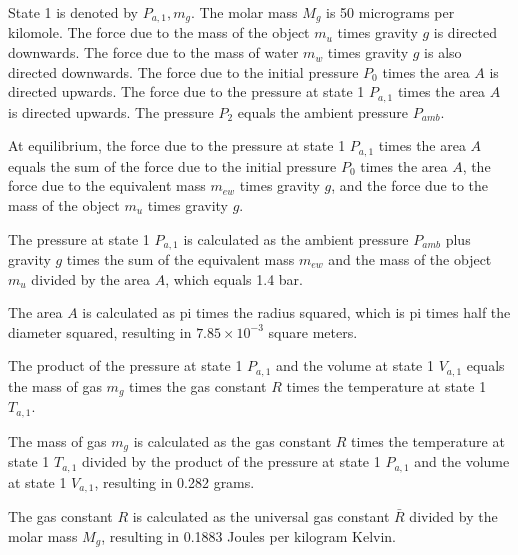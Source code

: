 State 1 is denoted by \( P_{a,1}, m_g \).
The molar mass \( M_g \) is 50 micrograms per kilomole.
The force due to the mass of the object \( m_u \) times gravity \( g \) is directed downwards.
The force due to the mass of water \( m_w \) times gravity \( g \) is also directed downwards.
The force due to the initial pressure \( P_0 \) times the area \( A \) is directed upwards.
The force due to the pressure at state 1 \( P_{a,1} \) times the area \( A \) is directed upwards.
The pressure \( P_2 \) equals the ambient pressure \( P_{amb} \).

At equilibrium, the force due to the pressure at state 1 \( P_{a,1} \) times the area \( A \) equals the sum of the force due to the initial pressure \( P_0 \) times the area \( A \), the force due to the equivalent mass \( m_{ew} \) times gravity \( g \), and the force due to the mass of the object \( m_u \) times gravity \( g \).

The pressure at state 1 \( P_{a,1} \) is calculated as the ambient pressure \( P_{amb} \) plus gravity \( g \) times the sum of the equivalent mass \( m_{ew} \) and the mass of the object \( m_u \) divided by the area \( A \), which equals 1.4 bar.

The area \( A \) is calculated as pi times the radius squared, which is pi times half the diameter squared, resulting in \( 7.85 \times 10^{-3} \) square meters.

The product of the pressure at state 1 \( P_{a,1} \) and the volume at state 1 \( V_{a,1} \) equals the mass of gas \( m_g \) times the gas constant \( R \) times the temperature at state 1 \( T_{a,1} \).

The mass of gas \( m_g \) is calculated as the gas constant \( R \) times the temperature at state 1 \( T_{a,1} \) divided by the product of the pressure at state 1 \( P_{a,1} \) and the volume at state 1 \( V_{a,1} \), resulting in 0.282 grams.

The gas constant \( R \) is calculated as the universal gas constant \( \bar{R} \) divided by the molar mass \( M_g \), resulting in 0.1883 Joules per kilogram Kelvin.